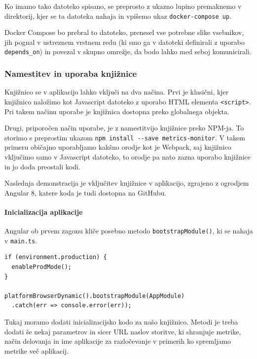 \documentclass[a4paper, 12pt]{book}
\begin{document}
Ko imamo tako datoteko spisano, se preprosto z ukazno lupino premaknemo v direktorij, kjer se ta datoteka nahaja in vpišemo ukaz \verb|docker-compose up|.

Docker Compose bo prebral to datoteko, prenesel vse potrebne slike vsebnikov, jih pognal v ustreznem vrstnem redu (ki smo ga v datoteki definirali z uporabo \verb|depends_on|) in povezal v skupno omrežje, da bodo lahko med seboj komunicirali.

\subsubsection{Namestitev in uporaba knjižnice}

Knjižnico se v aplikacijo lahko vključi na dva načina. Prvi je klasični, kjer knjižnico naložimo kot Javascript datoteko z uporabo HTML elementa \verb|<script>|. Pri takem načinu uporabe je knjižnica dostopna preko globalnega objekta.

Drugi, priporočen način uporabe, je z namestitvijo knjižnice preko NPM-ja. To storimo s preprostim ukazom \verb|npm install --save metrics-monitor|. V takem primeru običajno uporabljamo kakšno orodje kot je Webpack, saj knjižnico vključimo samo v Javascript datoteko, to orodje pa nato zazna uporabo knjižnice in jo doda preostali kodi.

Naslednja demonstracija je vključitev knjižnice v aplikacijo, zgrajeno z ogrodjem Angular 8, katere koda je tudi dostopna na GitHubu.

\paragraph{Inicializacija aplikacije} 
Angular ob prvem zagonu kliče posebno metodo \verb|bootstrapModule()|, ki se nahaja v \verb|main.ts|.

\begin{lstlisting}[label=code:lib_main_ts, caption=Zagon Angular aplikacije]
if (environment.production) {
  enableProdMode();
}

platformBrowserDynamic().bootstrapModule(AppModule)
  .catch(err => console.error(err));
\end{lstlisting}

Tukaj moramo dodati inicializacijsko kodo za našo knjižnico. Metodi je treba dodati še nekaj parametrov in sicer URL naslov storitve, ki shranjuje metrike, način delovanja in ime aplikacije za razločevanje v primerih ko spremljamo metrike več aplikacij. \\
\end{document}
